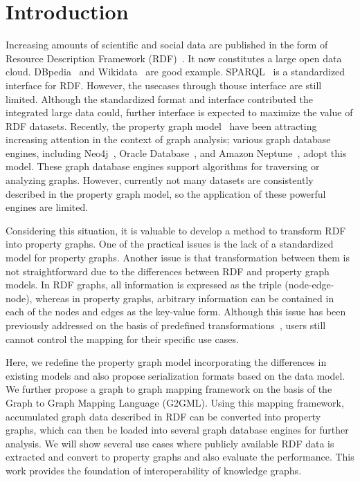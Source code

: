\documentclass[runningheads]{llncs}
\begin{document}
\section{Introduction}

Increasing amounts of scientific and social data are published in the form of Resource Description Framework (RDF)~\cite{rdf}. It now constitutes a large open data cloud. DBpedia~\cite{dbpedia} and Wikidata~\cite{wikidata} are good example. SPARQL~\cite{sparql} is a standardized interface for RDF. However, the usecases through thouse interface are still limited. Although the standardized format and interface contributed the integrated large data could, further interface is expected to maximize the value of RDF datasets. 
Recently, the property graph model~\cite{angles1,angles2} have been attracting increasing attention in the context of graph analysis; various graph database engines, including Neo4j~\cite{neo4j}, Oracle Database~\cite{oracle}, and Amazon Neptune~\cite{neptune}, adopt this model. These graph database engines support algorithms for traversing or analyzing graphs. However, currently not many datasets are consistently described in the property graph model, so the application of these powerful engines are limited.

Considering this situation, it is valuable to develop a method to transform RDF into property graphs. One of the practical issues is the lack of a standardized model for property graphs. 
Another issue is that transformation between them is not straightforward due to the differences between RDF and property graph models. 
In RDF graphs, all information is expressed as the triple (node-edge-node), whereas in property graphs, arbitrary information can be contained in each of the nodes and edges as the key-value form. 
Although this issue has been previously addressed on the basis of predefined transformations~\cite{hartig},
users still cannot control the mapping for their specific use cases.

Here, we redefine the property graph model incorporating the differences in existing models and also propose serialization formats based on the data model. We further propose a graph to graph mapping framework on the basis of the Graph to Graph Mapping Language (G2GML). Using this mapping framework, accumulated graph data described in RDF can be converted into property graphs, which can then be loaded into several graph database engines for further analysis. We will show several use cases where publicly available RDF data is extracted and convert to property graphs and also evaluate the performance. This work provides the foundation of interoperability of knowledge graphs.
\end{document}
